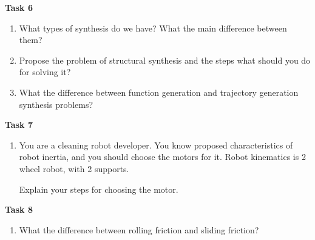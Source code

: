 \documentclass[12pt]{article}
\begin{document}
\textbf{Task 6}
\begin{enumerate}
    \item What types of synthesis do we have? What the main difference between them?
    \item Propose the problem of structural synthesis and the steps what should you do for solving it?
    \item What the difference between function generation and trajectory generation synthesis problems?
\end{enumerate}

\textbf{Task 7}
\begin{enumerate}
    \item You are a cleaning robot developer. You know proposed characteristics of robot inertia, and you should choose the motors for it. Robot kinematics is 2 wheel robot, with 2 supports.

    Explain your steps for choosing the motor.
\end{enumerate}

\textbf{Task 8}
\begin{enumerate}
    \item What the difference between rolling friction and sliding friction? 
\end{enumerate}
\end{document}
